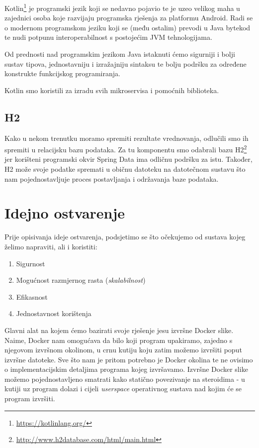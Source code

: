 \documentclass[times, utf8, zavrsni]{fer}
\begin{document}
Kotlin{\footnote{\url{https://kotlinlang.org/}}} je programski jezik koji se nedavno pojavio te je uzeo velikog maha u zajednici osoba koje razvijaju programska rješenja za platformu Android. Radi se o modernom programskom jeziku koji se (među ostalim) prevodi u Java bytekod te nudi potpunu interoperabilnost s postojećim JVM tehnologijama.

Od prednosti nad programskim jezikom Java istaknuti ćemo sigurniji i bolji sustav tipova, jednostavniju i izražajniju sintaksu te bolju podršku za određene konstrukte funkcijskog programiranja.

Kotlin smo koristili za izradu svih mikroservisa i pomoćnih biblioteka. 

\subsection{H2}

Kako u nekom trenutku moramo spremiti rezultate vrednovanja, odlučili smo ih spremiti u relacijsku bazu podataka. Za tu komponentu smo odabrali bazu H2{\footnote{\url{http://www.h2database.com/html/main.html}}} jer korišteni programski okvir Spring Data ima odličnu podršku za istu. Također, H2 može svoje podatke spremati u običnu datoteku na datotečnom sustavu što nam pojednostavljuje proces postavljanja i održavanja baze podataka.

\section{Idejno ostvarenje}

Prije opisivanja ideje ostvarenja, podsjetimo se što očekujemo od sustava kojeg želimo napraviti, ali i koristiti:

\begin{enumerate}
\item Sigurnost
\item Mogućnost razmjernog rasta (\textit{skalabilnost})
\item Efikasnost
\item Jednostavnost korištenja
\end{enumerate}

Glavni alat na kojem ćemo bazirati svoje rješenje jesu izvršne Docker slike. Naime, Docker nam omogućava da bilo koji program upakiramo, zajedno s njegovom izvršnom okolinom, u crnu kutiju koju zatim možemo izvršiti poput izvršne datoteke. Sve što nam je pritom potrebno je Docker okolina te ne ovisimo o implementacijskim detaljima programa kojeg izvršavamo. Izvršne Docker slike možemo pojednostavljeno smatrati kako statično povezivanje na steroidima - u kutiji uz program dolazi i cijeli \textit{userspace} operativnog sustava nad kojim će se program izvršiti.
\end{document}
